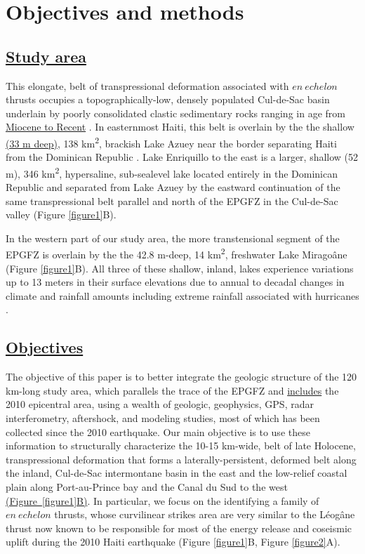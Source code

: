 \documentclass[linenumbers,draft]{agujournal}
\begin{document}
\section{Objectives and methods}
\subsection{\ul{Study area}}
This elongate, belt of transpressional deformation associated with $en~echelon$ thrusts occupies a topographically-low, densely populated Cul-de-Sac basin underlain by poorly consolidated clastic sedimentary rocks ranging in age from \ul{Miocene to Recent} \citep{massoni1955haiti,mann1995actively,terrier2014revision,saint2015seismotectonics}. In easternmost Haiti, this belt is overlain by the the shallow \ul{(33 m deep)}, 138 km\textsuperscript{2}, brackish Lake Azuey near the border separating Haiti from the Dominican Republic \citep{wright2015factors,piasecki2016bathymetric}. Lake Enriquillo to the east is a larger, shallow (52 m), 346 km\textsuperscript{2}, hypersaline, sub-sealevel lake located entirely in the Dominican Republic and separated from Lake Azuey by the eastward continuation of the same transpressional belt parallel and north of the EPGFZ in the Cul-de-Sac valley \citep{mann1995actively} (Figure \ref{figure1}B). 

In the western part of our study area, the more transtensional segment of the EPGFZ is overlain by the the 42.8 m-deep, 14 km\textsuperscript{2}, freshwater Lake Mirago\^ane (Figure \ref{figure1}B). All three of these shallow, inland, lakes experience variations up to 13 meters in their surface elevations due to annual to decadal changes in climate and rainfall amounts including extreme rainfall associated with hurricanes \citep{wright2015factors,piasecki2016bathymetric,moknatian2017development,rico2017hydrodynamic}.  

\subsection{\ul{Objectives}}
The objective of this paper is to better integrate the geologic structure of the 120 km-long study area, which parallels the trace of the EPGFZ and \ul{includes} the 2010 epicentral area, using a wealth of geologic, geophysics, GPS, radar interferometry, aftershock, and modeling studies, most of which has been collected since the 2010 earthquake. Our main objective is to use these information to structurally characterize the 10-15 km-wide, belt of late Holocene, transpressional deformation that forms a laterally-persistent, deformed belt along the inland, Cul-de-Sac intermontane basin in the east and the low-relief coastal plain along Port-au-Prince bay and the Canal du Sud to the west \underline{(Figure~\ref{figure1}B)}. In particular, we focus on the identifying a family of $en~echelon$ thrusts, whose curvilinear strikes area are very similar to the L\'eog\^ane thrust now known to be responsible for most of the energy release and coseismic uplift during the 2010 Haiti earthquake \citep{calais2010transpressional,douilly2013crustal,douilly2015three} (Figure \ref{figure1}B, Figure \ref{figure2}A).
\end{document}
